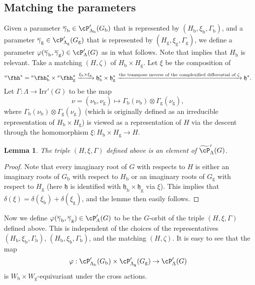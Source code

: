 \documentclass[12pt,a4paper]{amsart}
\newcommand{\h}{\mathfrak h}
\newcommand{\be}{\begin {equation}}
\newcommand{\ee}{\end {equation}}
\numberwithin{equation}{section}
\newtheorem{lem}[thm]{Lemma}
\theoremstyle{remark}
\def\Irr{\mathrm{Irr}}
\def\hha{{}^a\fhh}
\begin{document}
\subsection{Matching the parameters}
Given a parameter $\overline\gamma_\mathrm b \in\cP'_{\Lambda_\mathrm b}(G_\mathrm b)$ that is represented by $(H_\mathrm b, \xi_\mathrm b, \Gamma_\mathrm b)$, and  a parameter $\overline\gamma_\mathrm g \in\cP'_{\Lambda_\mathrm g}(G_\mathrm g)$ that is represented by $(H_\mathrm g, \xi_\mathrm g, \Gamma_\mathrm g)$, we  define  a parameter $\varphi(\overline\gamma_\mathrm b, \overline \gamma_\mathrm g) \in\cP'_{\Lambda}(G)$ as in what follows. Note that  implies that $H_\mathrm b$ is  relevant. Take a matching $(H, \zeta)$ of $H_\mathrm b\times H_\mathrm g$. Let $\xi$ be the composition of
\[
    \hha^*=\hha_\mathrm b^*\times  \hha_\mathrm g^*\xrightarrow{\xi_\mathrm b\times \xi_\mathrm g} \h_\mathrm b^*\times \h_\mathrm g^*\xrightarrow{\textrm{the transpose inverse of the complexified differential of $\zeta$}} \h^*.
\]
Let $\Gamma: \Lambda\rightarrow \Irr'(G)$ to be the map
\[
  \nu=(\nu_\mathrm b, \nu_\mathrm g)\mapsto \Gamma_\mathrm b(\nu_\mathrm b)\otimes \Gamma_\mathrm g(\nu_\mathrm g),
\]
where  $\Gamma_\mathrm b(\nu_\mathrm b)\otimes \Gamma_\mathrm g(\nu_\mathrm g)$ (which is originally defined as an irreducible representation of $H_\mathrm b\times H_\mathrm g$) is viewed as a representation of $H$ via the descent through the homomorphism $\xi: H_\mathrm b\times H_\mathrm g\rightarrow H$.




\begin{lem}
The triple $(H, \xi, \Gamma)$ defined above is an element of $\widetilde \cP'_{\Lambda}(G)$.
\end{lem}
\begin{proof}
Note that
every imaginary root of $G$ with respects to $H$ is either an  imaginary roots of $G_\mathrm b$ with respect to $H_\mathrm b$ or an  imaginary roots of $G_\mathrm g$ with respect to $H_\mathrm g$ (here $\h$ is identified with $\h_\mathrm b\times \h_\mathrm g$ via $\xi$). This  implies that $\delta(\xi)=\delta(\xi_\mathrm b)+\delta(\xi_\mathrm g)$, and the lemme then easily follows.


\end{proof}





Now we define  $\varphi(\overline\gamma_\mathrm b, \overline \gamma_\mathrm g) \in\cP'_{\Lambda}(G)$ to be the $G$-orbit of the triple  $(H, \xi, \Gamma)$ defined above.
This is independent of the choices of the representatives $(H_\mathrm b, \xi_\mathrm b, \Gamma_\mathrm b)$, $(H_\mathrm b, \xi_\mathrm b, \Gamma_\mathrm b)$, and the matching $(H, \zeta)$. It is easy to see that the map
\be\label{match0}
  \varphi: \cP'_{\Lambda_\mathrm b}(G_\mathrm b)\times \cP'_{\Lambda_\mathrm g}(G_\mathrm g)\rightarrow \cP'_{\Lambda}(G)
\ee
is $W_\mathrm b\times W_\mathrm g$-equivariant under the cross actions.
\end{document}
